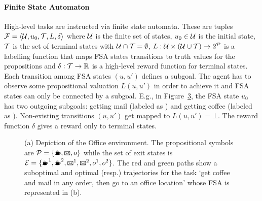 \paragraph{Finite State Automaton} High-level tasks are instructed via finite state automata. These are tuples ${\mathcal{F}=\langle \mathcal{U},u_0,\mathcal{T},L,\delta\rangle}$ where $\mathcal{U}$ is the finite set of states, $u_0\in\mathcal{U}$ is the initial state, $\mathcal{T}$ is the set of terminal states with $\mathcal{U}\cap\mathcal{T}=\emptyset$, $L:\mathcal{U}\times(\mathcal{U}\cup\mathcal{T})\rightarrow 2^{\mathcal{P}}$ is a labelling function that maps FSA states transitions to truth values for the propositions and $\delta:\mathcal{T}\rightarrow \mathbb{R}$ is a high-level reward function for terminal states. Each transition among FSA states $(u, u')$ defines a subgoal. The agent has to observe some propositional valuation $L(u, u')$ in order to achieve it and FSA states can only be connected by a subgoal. E.g., in Figure~\ref{fig:office_fsa}, the FSA state $u_0$ has two outgoing subgoals: getting mail (labeled as \mail) and getting coffee (labeled as \coffee). Non-existing transitions $(u, u')$ get mapped to $L(u, u')=\bot$. The reward function $\delta$ gives a reward only to terminal states. %


\begin{figure}[!tb]
  \centering
  \begin{subfigure}[h]{0.5\textwidth}
    \centering
  
  \subcaption{}
  \label{fig:office_env}
  \end{subfigure}
  \hfill
  \centering
  \begin{subfigure}[h]{0.49\textwidth}
    \centering
  
  \subcaption{}
  \label{fig:office_fsa}
  \end{subfigure}
  \caption{(a) Depiction of the Office environment. The propositional symbols are $\cP=\{\text{\coffee}, \text{\mail}, o\}$ while the set of exit states is $\cE=\{\text{\coffee}^1,\text{\coffee}^2, \text{\mail}^1,\text{\mail}^2, o^1, o^2\}$. The red and green paths show a suboptimal and optimal (resp.) trajectories for the task `get coffee and mail in any order, then go to an office location' whose FSA is represented in (b).}
\end{figure}


